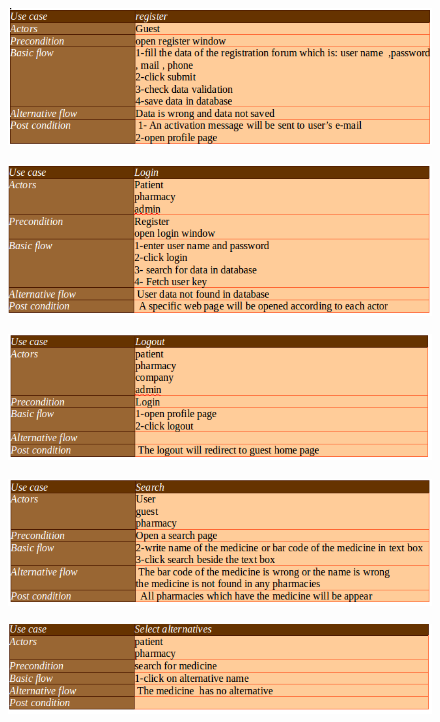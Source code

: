 \documentclass[]{article}
\begin{document}
\begin{figure}[H]
\centering
\includegraphics[scale=0.4]{./scenario/01}
\end{figure}
\begin{figure}[H]
\centering
\includegraphics[scale=0.4]{./scenario/02}
\end{figure}
\begin{figure}[H]
\centering
\includegraphics[scale=0.4]{./scenario/03}
\end{figure}
\begin{figure}[H]
\centering
\includegraphics[scale=0.4]{./scenario/04}
\end{figure}
\begin{figure}[H]
\centering
\includegraphics[scale=0.4]{./scenario/05}
\end{figure}
\end{document}

